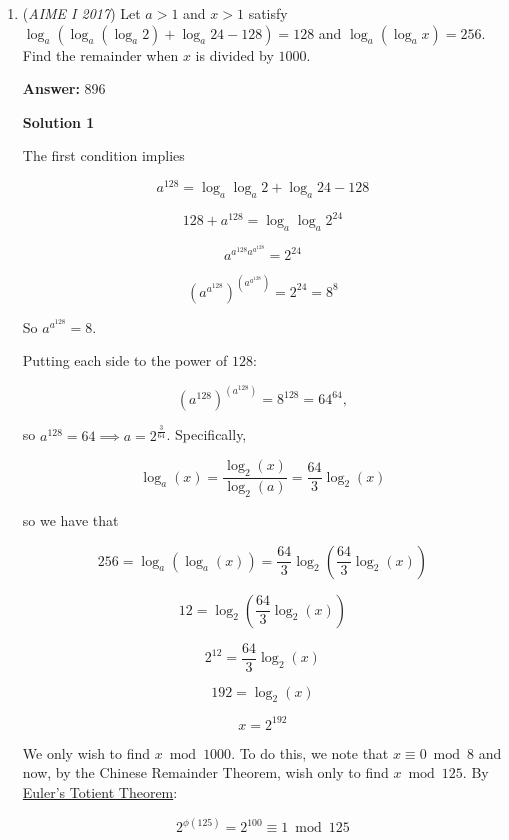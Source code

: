 \begin{enumerate}
 What we have just shown now is that $a \geq 4$. Now note that the minimum range we found that worked was $(\frac{a^{3}}{2}, a^{3})$ where $n = \frac{a^{3}}{2}$. We plug in $a = 4$ to get $n = 32$ and hence $Q(2) = 32$. We can now apply the same procedure to the other numbers and finish as the above solutions.

 


	\item (\textit{AIME I 2017}) Let $a > 1$ and $x > 1$ satisfy $\log_a(\log_a(\log_a 2) + \log_a 24 - 128) = 128$ and $\log_a(\log_a x) = 256$. Find the remainder when $x$ is divided by $1000$.


 
 \textbf{Answer: }896



\textbf{Solution 1}

The first condition implies

 
 \[a^{128} = \log_a\log_a 2 + \log_a 24 - 128\]

 \[128+a^{128} = \log_a\log_a 2^{24}\]

 \[a^{a^{128}a^{a^{128}}} = 2^{24}\]

 \[\left(a^{a^{128}}\right)^{\left(a^{a^{128}}\right)} = 2^{24} = 8^8\]

 So $a^{a^{128}} = 8$. 

 Putting each side to the power of $128$:

 
 \[\left(a^{128}\right)^{\left(a^{128}\right)} = 8^{128} = 64^{64},\]

 so $a^{128} = 64 \implies a = 2^{\frac{3}{64}}$. Specifically,

 
 \[\log_a(x) = \frac{\log_2(x)}{\log_2(a)} = \frac{64}{3}\log_2(x)\]

 so we have that

 
 \[256 = \log_a(\log_a(x)) = \frac{64}{3}\log_2\left(\frac{64}{3}\log_2(x)\right)\]

 \[12 = \log_2\left(\frac{64}{3}\log_2(x)\right)\]

 \[2^{12} = \frac{64}{3}\log_2(x)\]

 \[192 = \log_2(x)\]

 \[x = 2^{192}\]

 We only wish to find $x\bmod 1000$. To do this, we note that $x\equiv 0\bmod 8$ and now, by the Chinese Remainder Theorem, wish only to find $x\bmod 125$. By \href{https://artofproblemsolving.com/wiki/index.php?title=Euler\%27s\_Totient\_Theorem}{Euler's Totient Theorem}:

 
 \[2^{\phi(125)} = 2^{100} \equiv 1\bmod 125\]


\end{enumerate}
